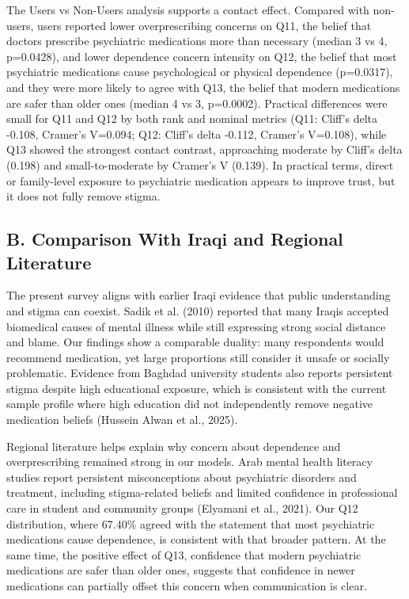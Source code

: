 \documentclass[12pt,a4paper]{article}
\begin{document}
The Users vs Non-Users analysis supports a contact effect. Compared with non-users, users reported lower overprescribing concerns on Q11, the belief that doctors prescribe psychiatric medications more than necessary (median 3 vs 4, p=0.0428), and lower dependence concern intensity on Q12, the belief that most psychiatric medications cause psychological or physical dependence (p=0.0317), and they were more likely to agree with Q13, the belief that modern medications are safer than older ones (median 4 vs 3, p=0.0002). Practical differences were small for Q11 and Q12 by both rank and nominal metrics (Q11: Cliff’s delta -0.108, Cramer’s V=0.094; Q12: Cliff’s delta -0.112, Cramer’s V=0.108), while Q13 showed the strongest contact contrast, approaching moderate by Cliff’s delta (0.198) and small-to-moderate by Cramer’s V (0.139). In practical terms, direct or family-level exposure to psychiatric medication appears to improve trust, but it does not fully remove stigma.

\subsection*{B. Comparison With Iraqi and Regional Literature}
The present survey aligns with earlier Iraqi evidence that public understanding and stigma can coexist. Sadik et al. (2010) reported that many Iraqis accepted biomedical causes of mental illness while still expressing strong social distance and blame. Our findings show a comparable duality: many respondents would recommend medication, yet large proportions still consider it unsafe or socially problematic. Evidence from Baghdad university students also reports persistent stigma despite high educational exposure, which is consistent with the current sample profile where high education did not independently remove negative medication beliefs (Hussein Alwan et al., 2025).

Regional literature helps explain why concern about dependence and overprescribing remained strong in our models. Arab mental health literacy studies report persistent misconceptions about psychiatric disorders and treatment, including stigma-related beliefs and limited confidence in professional care in student and community groups (Elyamani et al., 2021). Our Q12 distribution, where 67.40\% agreed with the statement that most psychiatric medications cause dependence, is consistent with that broader pattern. At the same time, the positive effect of Q13, confidence that modern psychiatric medications are safer than older ones, suggests that confidence in newer medications can partially offset this concern when communication is clear.
\end{document}
